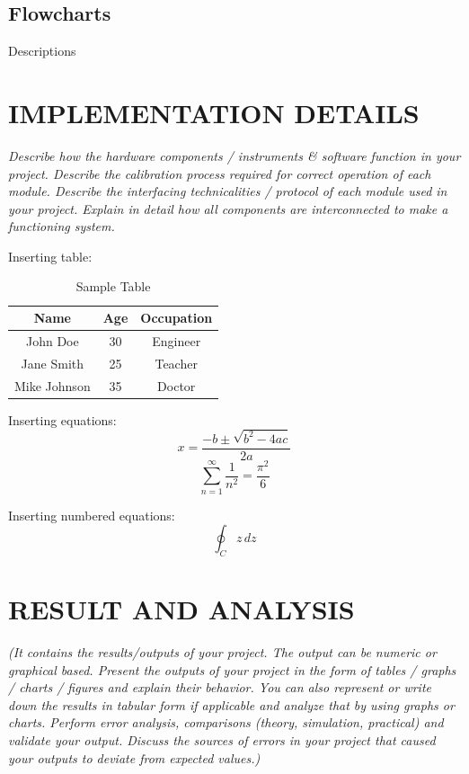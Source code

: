 \documentclass{ioereport}
\begin{document}
    \subsection{Flowcharts}
    Descriptions

    \pagebreak

\section{\MakeUppercase{Implementation Details}}
    \textit{Describe how the hardware components / instruments \& software function in your project. Describe the calibration process required for correct operation of each module. Describe the interfacing technicalities / protocol of each module used in your project. Explain in detail how all components are interconnected to make a functioning system.}

    Inserting table:\\
    \begin{table}[H]
        \caption{Sample Table}
        \label{tab:sample}
        \centering
        \begin{tabular}{|c|c|c|}
            \hline
            \textbf{Name} & \textbf{Age} & \textbf{Occupation} \\
            \hline
            John Doe & 30 & Engineer \\
            Jane Smith & 25 & Teacher \\
            Mike Johnson & 35 & Doctor \\
            \hline
        \end{tabular}
    \end{table}
    
    Inserting equations:\\
    $$ x = \frac{-b \pm \sqrt{b^2 - 4ac}}{2a} $$
    \[ 
        \sum_{n=1}^{\infty} \frac{1}{n^2} = \frac{\pi^2}{6}
    \]
    
    Inserting numbered equations:\\
    \begin{equation} \label{eqn:integral}
        \oint_C z\,dz
    \end{equation}

    \pagebreak 

\section{\MakeUppercase{Result and Analysis}}
    \textit{(It contains the results/outputs of your project. The output can be numeric or graphical based. Present the outputs of your project in the form of tables / graphs / charts / figures and explain their behavior. You can also represent or write down the results in tabular form if applicable and analyze that by using graphs or charts. Perform error analysis, comparisons (theory, simulation, practical) and validate your output. Discuss the sources of errors in your project that caused your outputs to deviate from expected values.)
    }
\end{document}
